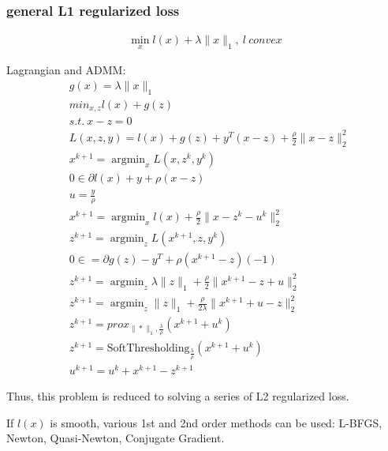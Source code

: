 \message{ !name(notebook.tex)}\documentclass[8pt]{report}
\DeclareMathOperator*{\argmin}{argmin}
\newcommand{\norm}[1]{\|#1\|}
\begin{document}
\begin{multicols*}{2}
  \subsubsection{general L1 regularized loss}
  \begin{align*}
    \min_x l(x) + \lambda \norm{x}_1,\ l\ convex
  \end{align*}

  Lagrangian and ADMM:
  \begin{align*}
    &g(x)=\lambda \norm{x}_1\\
    &min_{x,z} l(x) + g(z)\\
    &s.t.\ x-z=0\\
    &L(x,z,y) = l(x) + g(z) + y^T (x-z)+\frac{\rho}{2}\norm{x-z}_2^2\\
    &x^{k+1}=\argmin_x L(x, z^k, y^k)\\
    &0 \in \partial l(x) + y + \rho(x-z)\\
    &u=\frac{y}{\rho}\\
    &x^{k+1}=\argmin_x l(x) + \frac{\rho}{2}\norm{x-z^k-u^k}_2^2\\
    &z^{k+1}=\argmin_z L(x^{k+1}, z, y^k)\\
    &0 \in = \partial g(z) - y^T + \rho (x^{k+1}-z)(-1)\\
    &z^{k+1}=\argmin_z \lambda \norm{z}_1 + \frac{\rho}{2}\norm{x^{k+1}-z+u}_2^2\\
    &z^{k+1}=\argmin_z \norm{z}_1 + \frac{\rho}{2\lambda}\norm{x^{k+1}+u-z}_2^2\\
    &z^{k+1}=prox_{\norm{*}_1, \frac{\lambda}{\rho}}(x^{k+1}+u^k)\\
    &z^{k+1}=\text{SoftThresholding}_{\frac{\lambda}{\rho}}(x^{k+1}+u^k)\\
    &u^{k+1} = u^k + x^{k+1} - z^{k+1}
  \end{align*}

  Thus, this problem is reduced to solving a series of L2 regularized loss.

  If $l(x)$ is smooth, various 1st and 2nd order methods can be used: L-BFGS, Newton, Quasi-Newton, Conjugate Gradient.

  \vfill\null
  \columnbreak
  

\end{multicols*}
\end{document}
